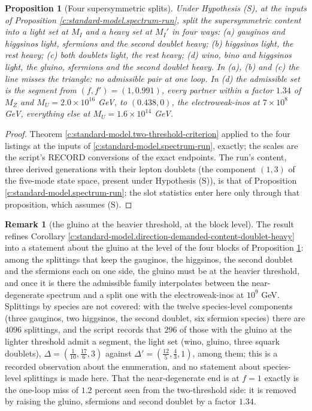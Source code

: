 \documentclass[11pt]{article}
\newtheorem{proposition}[theorem]{Proposition}
\theoremstyle{definition}
\newtheorem{remark}[theorem]{Remark}
\theoremstyle{plain}
\newcommand{\changedmark}[2]{\marginpar{\raggedright\scriptsize\color{#1}#2}}
\providecommand{\Dl}{}\renewcommand{\Dl}{\Delta}
\begin{document}
\begin{proposition}[Four supersymmetric splits]\label{c:standard-model.four-supersymmetric-splits}
\changedmark{gray}{reworded}
Under Hypothesis (S), at the inputs of Proposition \ref{c:standard-model.spectrum-run}, split the supersymmetric content into a light set at $M_{I}$ and a heavy set at $M_{I}'$ in four ways: (a) gauginos and higgsinos light, sfermions and the second doublet heavy; (b) higgsinos light, the rest heavy; (c) both doublets light, the rest heavy; (d) wino, bino and higgsinos light, the gluino, sfermions and the second doublet heavy. In (a), (b) and (c) the line misses the triangle: no admissible pair at one loop. In (d) the admissible set is the segment from $(f, f') = (1, 0.991)$, every partner within a factor $1.34$ of $M_{Z}$ and $M_{U} = 2.0 \times 10^{16}$ GeV, to $(0.438, 0)$, the electroweak-inos at $7 \times 10^{8}$ GeV, everything else at $M_{U} = 1.6 \times 10^{14}$ GeV.
\end{proposition}
\begin{proof}
Theorem \ref{c:standard-model.two-threshold-criterion} applied to the four listings at the inputs of \ref{c:standard-model.spectrum-run}, exactly; the scales are the script's RECORD conversions of the exact endpoints. The run's content, three derived generations with their lepton doublets (the component $(1,3)$ of the five-mode state space, present under Hypothesis (S)), is that of Proposition \ref{c:standard-model.spectrum-run}; the slot statistics enter here only through that proposition, which assumes (S).

\end{proof}

\begin{remark}[the gluino at the heavier threshold, at the block level]\label{c:note.standard-model.gluino-heavier-threshold-block-level}
The result refines Corollary \ref{c:standard-model.direction-demanded-content-doublet-heavy} into a statement about the gluino at the level of the four blocks of Proposition \ref{c:standard-model.four-supersymmetric-splits}: among the splittings that keep the gauginos, the higgsinos, the second doublet and the sfermions each on one side, the gluino must be at the heavier threshold, and once it is there the admissible family interpolates between the near-degenerate spectrum and a split one with the electroweak-inos at $10^{9}$ GeV. Splittings by species are not covered: with the twelve species-level components (three gauginos, two higgsinos, the second doublet, six sfermion species) there are $4096$ splittings, and the script records that $296$ of those with the gluino at the lighter threshold admit a segment, the light set (wino, gluino, three squark doublets), $\Dl = (\tfrac{1}{10}, \tfrac{17}{6}, 3)$ against $\Dl' = (\tfrac{12}{5}, \tfrac43, 1)$, among them; this is a recorded observation about the enumeration, and no statement about species-level splittings is made here. That the near-degenerate end is at $f = 1$ exactly is the one-loop miss of $1.2$ percent seen from the two-threshold side: it is removed by raising the gluino, sfermions and second doublet by a factor $1.34$.
\end{remark}
\end{document}
